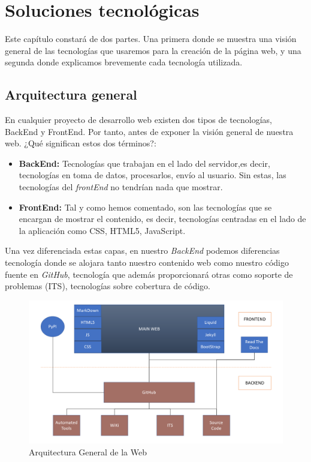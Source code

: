 \chapter{Soluciones tecnológicas}
\label{chap:Arqui}
Este capítulo constará de dos partes. Una primera donde se muestra una visión general de las tecnologías que usaremos para la creación de la página web, y una segunda donde explicamos brevemente cada tecnología utilizada.

\section{Arquitectura general}
\label{sec:arqui}
En cualquier proyecto de desarrollo web existen dos tipos de tecnologías, BackEnd y FrontEnd. Por tanto, antes de exponer la visión general de nuestra web. ¿Qué significan estos dos términos?:
\begin{itemize}
    \item \textbf{BackEnd:} Tecnologías que trabajan en el lado del servidor,es decir, tecnologías en toma de datos, procesarlos, envío al usuario. Sin estas, las tecnologías del \emph{frontEnd} no tendrían nada que mostrar.
    \item \textbf{FrontEnd:} Tal y como hemos comentado, son las tecnologías que se encargan de mostrar el contenido, es decir, tecnologías centradas en el lado de la aplicación como CSS, HTML5, JavaScript.
\end{itemize}
Una vez diferenciada estas capas, en nuestro \emph{BackEnd} podemos diferencias tecnología donde se alojara tanto nuestro contenido web como nuestro código fuente en \emph{GitHub}, tecnología que además proporcionará otras como soporte de problemas (ITS), tecnologías sobre cobertura de código. \\
\begin{figure}[h]
    \centering
    \includegraphics[width=\textwidth]{img/arqui_general.png}
    \caption{Arquitectura General de la Web}
    \label{fig:arquiGeneral}
\end{figure}
